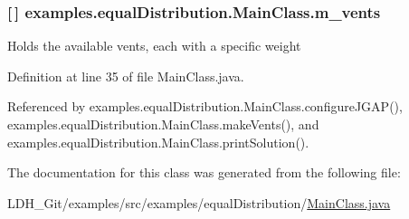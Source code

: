 \hypertarget{classexamples_1_1equal_distribution_1_1_main_class_a5bdc8a2b92042fd94d645a5d1b0f7a95}{
\subsubsection[{m\-\_\-vents}]{ \mbox{[}$\,$\mbox{]} examples.\-equal\-Distribution.\-Main\-Class.\-m\-\_\-vents\hspace{0.3cm}{\ttfamily [private]}}}\label{classexamples_1_1equal_distribution_1_1_main_class_a5bdc8a2b92042fd94d645a5d1b0f7a95}
Holds the available vents, each with a specific weight 

Definition at line 35 of file Main\-Class.\-java.



Referenced by examples.\-equal\-Distribution.\-Main\-Class.\-configure\-J\-G\-A\-P(), examples.\-equal\-Distribution.\-Main\-Class.\-make\-Vents(), and examples.\-equal\-Distribution.\-Main\-Class.\-print\-Solution().



The documentation for this class was generated from the following file\-:\begin{DoxyCompactItemize}
\item 
L\-D\-H\-\_\-\-Git/examples/src/examples/equal\-Distribution/\hyperlink{_main_class_8java}{Main\-Class.\-java}\end{DoxyCompactItemize}
